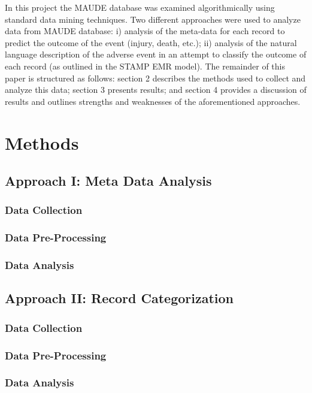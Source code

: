 \documentclass[11pt, notitlepage,abstracton,oneside]{article}   	%
\begin{document}
In this project the MAUDE database was examined algorithmically using standard data mining techniques. Two different approaches were used to analyze data from MAUDE database:  i) analysis of the meta-data for each record to predict the outcome of the event (injury, death, etc.); ii) analysis of the natural language description of the adverse event in an attempt to classify the outcome of each record (as outlined in the STAMP EMR model). The remainder of this paper is structured as follows: section 2 describes the methods used to collect and analyze this data; section 3 presents results; and section 4 provides a discussion of results and outlines strengths and weaknesses of the aforementioned approaches. 

\section{Methods}

\subsection{Approach I: Meta Data Analysis}

\subsubsection{Data Collection}

\subsubsection{Data Pre-Processing}

\subsubsection{Data Analysis}

\subsection{Approach II: Record Categorization}
\subsubsection{Data Collection}

\subsubsection{Data Pre-Processing}

\subsubsection{Data Analysis}
\end{document}

